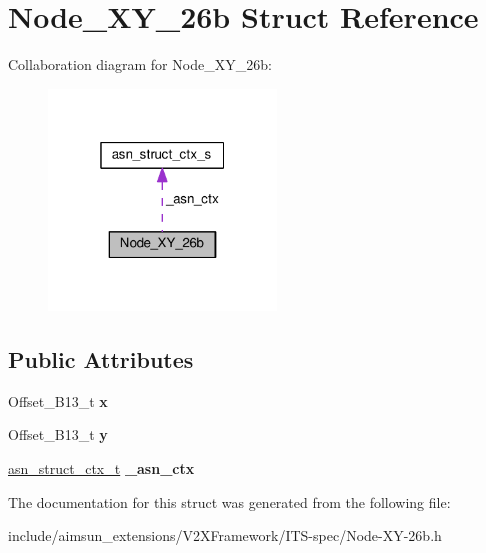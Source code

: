 \hypertarget{structNode__XY__26b}{}\section{Node\+\_\+\+X\+Y\+\_\+26b Struct Reference}
\label{structNode__XY__26b}


Collaboration diagram for Node\+\_\+\+X\+Y\+\_\+26b\+:\nopagebreak
\begin{figure}[H]
\begin{center}
\leavevmode
\includegraphics[width=172pt]{structNode__XY__26b__coll__graph}
\end{center}
\end{figure}
\subsection*{Public Attributes}
\begin{DoxyCompactItemize}
\item 
Offset\+\_\+\+B13\+\_\+t {\bfseries x}\hypertarget{structNode__XY__26b_a463c94a7db137a736b0aed178173168d}{}\label{structNode__XY__26b_a463c94a7db137a736b0aed178173168d}

\item 
Offset\+\_\+\+B13\+\_\+t {\bfseries y}\hypertarget{structNode__XY__26b_a88e8cf0f3ca5ebec826f606fbaa272dd}{}\label{structNode__XY__26b_a88e8cf0f3ca5ebec826f606fbaa272dd}

\item 
\hyperlink{structasn__struct__ctx__s}{asn\+\_\+struct\+\_\+ctx\+\_\+t} {\bfseries \+\_\+asn\+\_\+ctx}\hypertarget{structNode__XY__26b_ae1482f2729ead34b1377d736f276ef9c}{}\label{structNode__XY__26b_ae1482f2729ead34b1377d736f276ef9c}

\end{DoxyCompactItemize}


The documentation for this struct was generated from the following file\+:\begin{DoxyCompactItemize}
\item 
include/aimsun\+\_\+extensions/\+V2\+X\+Framework/\+I\+T\+S-\/spec/Node-\/\+X\+Y-\/26b.\+h\end{DoxyCompactItemize}
